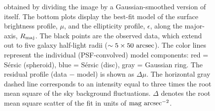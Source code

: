 \documentclass[useAMS,usenatbib,article]{mn2e}
\begin{document}
\begin{figure}
\begin{center}
{obtained by dividing the image by a Gaussian-smoothed version of itself. 
The bottom plots display the best-fit model of the surface brightness profile, $\mu$, 
and the ellipticity profile, $\epsilon$, 
along the major-axis, $R_{\rm maj}$. 
The black points are the observed data, which extend out to five galaxy half-light radii ($\sim 5 \times 50~\rm arcsec$). 
The color lines represent the individual (PSF-convolved) model components: 
red = S\'ersic (spheroid), blue = S\'ersic (disc), gray = Gaussian ring. 
The residual profile (data $-$ model) is shown as $\Delta \mu$. 
The horizontal gray dashed line corresponds to an intensity equal to three times the root mean square of the sky background fluctuations. 
$\Delta$ denotes the root mean square scatter of the fit in units of $\rm mag~arcsec^{-2}$. }
\label{fig:n3115}
\end{center}
\end{figure}
\end{document}
